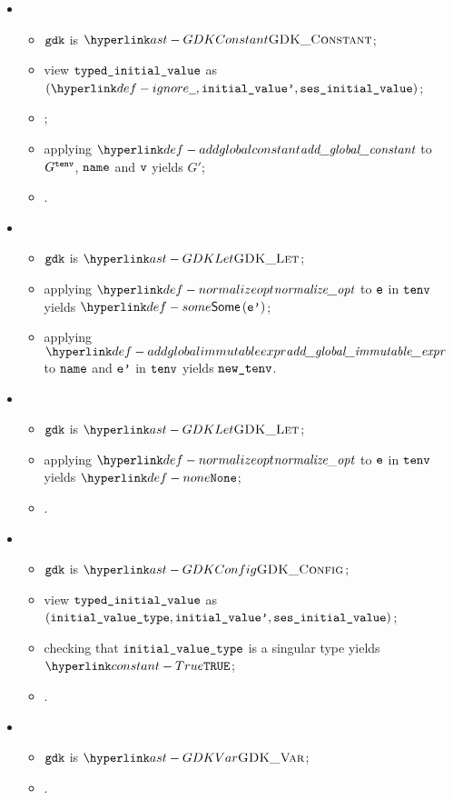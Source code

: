 \ProseParagraph
\OneApplies
\begin{itemize}
  \item {}
  \begin{itemize}
    \item $\texttt{gdk}$ is $\GDKConstant$;
    \item view $\texttt{typed\_initial\_value}$ as $(\Ignore, \initialvaluep, \vsesinitialvalue)$;
    \item \Prosestaticeval{$\tenv$}{$\initialvaluep$}{$\vv$};
    \item applying $\addglobalconstant$ to $G^{\texttt{tenv}}$, $\texttt{name}$ and $\vv$ yields $G'$;
    \item {}.
  \end{itemize}

  \item {}
  \begin{itemize}
    \item $\texttt{gdk}$ is $\GDKLet$;
    \item applying $\normalizeopt$ to $\texttt{e}$ in $\tenv$ yields $\some{\vep}$\ProseOrTypeError;
    \item applying $\addglobalimmutableexpr$ to $\texttt{name}$ and $\texttt{e'}$ in $\tenv$ yields $\newtenv$.
  \end{itemize}

  \item {}
  \begin{itemize}
    \item $\texttt{gdk}$ is $\GDKLet$;
    \item applying $\normalizeopt$ to $\texttt{e}$ in $\tenv$ yields $\None$\ProseOrTypeError;
    \item \Proseeqdef{$\newtenv$}{$\tenv$}.
  \end{itemize}

  \item {}
  \begin{itemize}
    \item $\texttt{gdk}$ is $\GDKConfig$;
    \item view $\texttt{typed\_initial\_value}$ as \\ $(\texttt{initial\_value\_type}, \texttt{initial\_value'}, \texttt{ses\_initial\_value})$;
    \item checking that $\texttt{initial\_value\_type}$ is a singular type yields $\True$\ProseOrTypeError;
    \item \Proseeqdef{$\newtenv$}{$\tenv$}.
  \end{itemize}

  \item {}
  \begin{itemize}
    \item $\texttt{gdk}$ is $\GDKVar$;
    \item \Proseeqdef{$\newtenv$}{$\tenv$}.
  \end{itemize}
\end{itemize}

